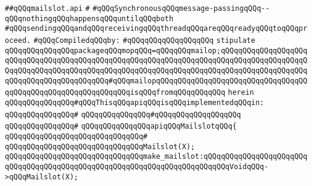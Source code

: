 \label{src/lib/src/lib/thread-kit/src/core-thread-kit/mailslot.api}
\verb|##qQQqmailslot.api|\newline
\verb|#|\newline
\verb|#qQQqSynchronousqQQqmessage-passingqQQq--qQQqnothingqQQqhappensqQQquntilqQQqboth|\newline
\verb|#qQQqsendingqQQqandqQQqreceivingqQQqthreadqQQqareqQQqreadyqQQqtoqQQqproceed.|\newline
\newline
\verb|#qQQqCompiledqQQqby:|\newline
\verb|#qQQqqQQqqQQqqQQqqQQq|\newline
\newline
\newline
\newline
\newline
\newline
\verb|stipulate|\newline
\verb|qQQqqQQqqQQqqQQqpackageqQQqmopqQQq=qQQqqQQqmailop;qQQqqQQqqQQqqQQqqQQqqQQqqQQqqQQqqQQqqQQqqQQqqQQqqQQqqQQqqQQqqQQqqQQqqQQqqQQqqQQqqQQqqQQqqQQqqQQqqQQqqQQqqQQqqQQqqQQqqQQqqQQqqQQqqQQqqQQqqQQqqQQqqQQqqQQqqQQqqQQqqQQqqQQqqQQqqQQqqQQqqQQq#qQQqmailopqQQqqQQqqQQqqQQqqQQqqQQqqQQqqQQqqQQqqQQqqQQqqQQqqQQqqQQqqQQqqQQqisqQQqfromqQQqqQQqqQQq|\newline
\verb|herein|\newline
\newline
\verb|qQQqqQQqqQQqqQQq#qQQqThisqQQqapiqQQqisqQQqimplementedqQQqin:|\newline
\verb|qQQqqQQqqQQqqQQq#|\newline
\verb|qQQqqQQqqQQqqQQq#qQQqqQQqqQQqqQQqqQQq|\newline
\verb|qQQqqQQqqQQqqQQq#|\newline
\verb|qQQqqQQqqQQqqQQqapiqQQqMailslotqQQq{|\newline
\verb|qQQqqQQqqQQqqQQqqQQqqQQqqQQqqQQq#|\newline
\verb|qQQqqQQqqQQqqQQqqQQqqQQqqQQqqQQqMailslot(X);|\newline
\newline
\verb|qQQqqQQqqQQqqQQqqQQqqQQqqQQqqQQqmake_mailslot:qQQqqQQqqQQqqQQqqQQqqQQqqQQqqQQqqQQqqQQqqQQqqQQqqQQqqQQqqQQqqQQqqQQqqQQqqQQqVoidqQQq->qQQqMailslot(X);|\newline
